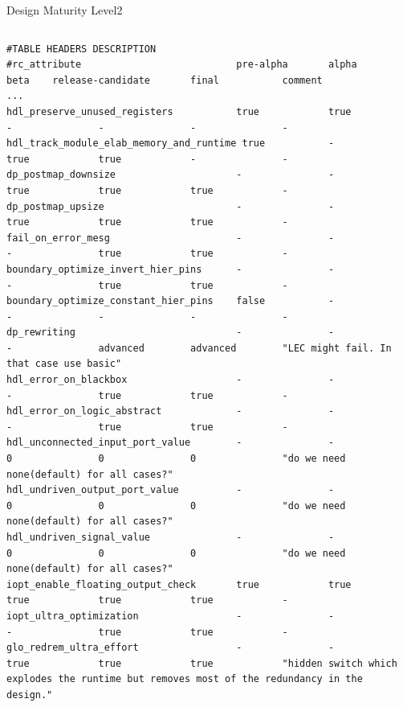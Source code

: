 \documentclass{beamer}
\begin{document}
\begin{frame}{Design Maturity Level}{2}
\begin{columns}
\begin{column}{1.1\textwidth}
\tiny
\begin{verbatim}
#TABLE HEADERS DESCRIPTION
#rc_attribute                           pre-alpha       alpha           beta    release-candidate       final           comment
...
hdl_preserve_unused_registers           true            true            -               -               -               -
hdl_track_module_elab_memory_and_runtime true           -               true            true            -               -
dp_postmap_downsize                     -               -               true            true            true            -
dp_postmap_upsize                       -               -               true            true            true            -
fail_on_error_mesg                      -               -               -               true            true            -
boundary_optimize_invert_hier_pins      -               -               -               true            true            -
boundary_optimize_constant_hier_pins    false           -               -               -               -               -
dp_rewriting                            -               -               -               advanced        advanced        "LEC might fail. In that case use basic"
hdl_error_on_blackbox                   -               -               -               true            true            -
hdl_error_on_logic_abstract             -               -               -               true            true            -
hdl_unconnected_input_port_value        -               -               0               0               0               "do we need none(default) for all cases?"
hdl_undriven_output_port_value          -               -               0               0               0               "do we need none(default) for all cases?"
hdl_undriven_signal_value               -               -               0               0               0               "do we need none(default) for all cases?"
iopt_enable_floating_output_check       true            true            true            true            true            -
iopt_ultra_optimization                 -               -               -               true            true            -
glo_redrem_ultra_effort                 -               -               true            true            true            "hidden switch which explodes the runtime but removes most of the redundancy in the design."

\end{verbatim}
\end{column}
\end{columns}
\end{frame}
\end{document}
